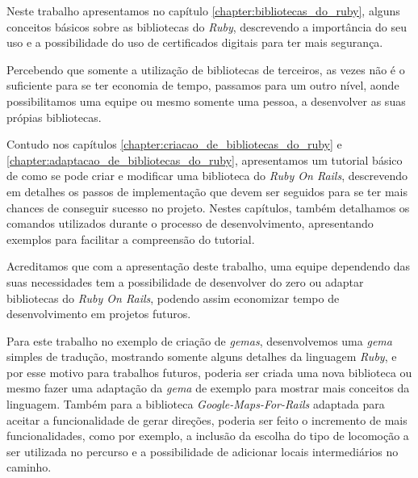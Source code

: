 Neste trabalho apresentamos no capítulo \ref{chapter:bibliotecas_do_ruby}, alguns conceitos básicos
sobre as bibliotecas do \emph{Ruby}, descrevendo a importância do seu uso e a possibilidade do uso
de certificados digitais para ter mais segurança.

Percebendo que somente a utilização de bibliotecas de terceiros, as vezes não é o suficiente para se
ter economia de tempo, passamos para um outro nível, aonde possibilitamos uma equipe ou mesmo somente
uma pessoa, a desenvolver as suas própias bibliotecas.

Contudo nos capítulos \ref{chapter:criacao_de_bibliotecas_do_ruby} e
\ref{chapter:adaptacao_de_bibliotecas_do_ruby}, apresentamos um tutorial
básico de como se pode criar e modificar uma biblioteca do \emph{Ruby On Rails}, descrevendo em
detalhes os passos de implementação que devem ser seguidos para se ter mais chances de conseguir
sucesso no projeto. Nestes capítulos, também detalhamos os comandos utilizados durante o processo
de desenvolvimento, apresentando exemplos para facilitar a compreensão do tutorial.

Acreditamos que com a apresentação deste trabalho, uma equipe dependendo das suas necessidades tem
a possibilidade de desenvolver do zero ou adaptar bibliotecas do \emph{Ruby On Rails}, podendo assim
economizar tempo de desenvolvimento em projetos futuros.

Para este trabalho no exemplo de criação de \emph{gemas}, desenvolvemos uma \emph{gema} simples de
tradução, mostrando somente alguns detalhes da linguagem \emph{Ruby}, e por esse motivo para
trabalhos futuros, poderia ser criada uma nova biblioteca ou mesmo fazer uma adaptação da
\emph{gema} de exemplo para mostrar mais conceitos da linguagem. Também para a biblioteca
\emph{Google-Maps-For-Rails} adaptada para aceitar a funcionalidade de gerar direções, poderia ser feito o
incremento de mais funcionalidades, como por exemplo, a inclusão da escolha do tipo de locomoção a ser
utilizada no percurso e a possibilidade de adicionar locais intermediários no caminho.